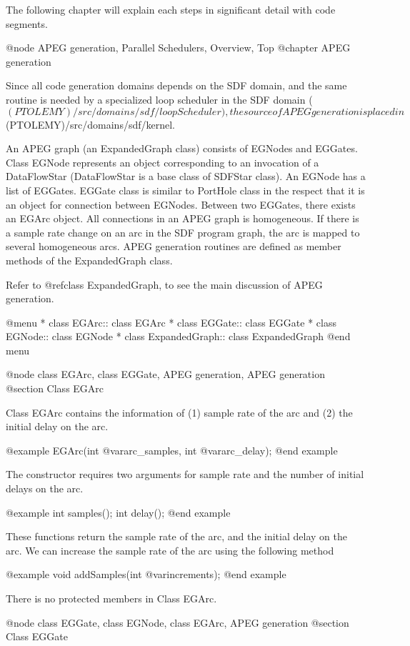 The following chapter will explain each steps in significant detail with
code segments.
 
@node APEG generation, Parallel Schedulers, Overview, Top
@chapter APEG generation

Since all code generation domains depends on the SDF domain, and 
the same routine is needed by a specialized loop scheduler in the SDF
domain ($(PTOLEMY)/src/domains/sdf/loopScheduler), the source of APEG 
generation is placed in $(PTOLEMY)/src/domains/sdf/kernel.

An APEG graph (an ExpandedGraph class) consists of EGNodes and 
EGGates. Class EGNode represents
an object corresponding to an invocation of a DataFlowStar (DataFlowStar
is a base class of SDFStar class). An EGNode has a list of EGGates.
EGGate class is similar to PortHole class in the respect that it
is an object for connection between EGNodes. Between two EGGates,
there exists an EGArc object. All connections in an APEG
graph is homogeneous. If there is a sample rate change on an arc in the
SDF program graph, the arc is mapped to several homogeneous arcs.
APEG generation routines are defined as member methods of the ExpandedGraph
class.

Refer to @ref{class ExpandedGraph}, to see the main discussion of APEG
generation.

@menu
* class EGArc::			class EGArc
* class EGGate::		class EGGate
* class EGNode::		class EGNode
* class ExpandedGraph::		class ExpandedGraph
@end menu

@node class EGArc, class EGGate, APEG generation, APEG generation
@section Class EGArc

Class EGArc contains the information of (1) sample rate
of the arc and (2) the initial delay on the arc.

@example
EGArc(int @var{arc_samples}, int @var{arc_delay});
@end example

The constructor requires two arguments for sample rate and the
number of initial delays on the arc.

@example
int samples();
int delay();
@end example

These functions return the sample rate of the arc, and the
initial delay on the arc. We can increase the sample rate of the
arc using the following method

@example
void addSamples(int @var{increments});
@end example

There is no protected members in Class EGArc.

@node class EGGate, class EGNode, class EGArc, APEG generation
@section Class EGGate

